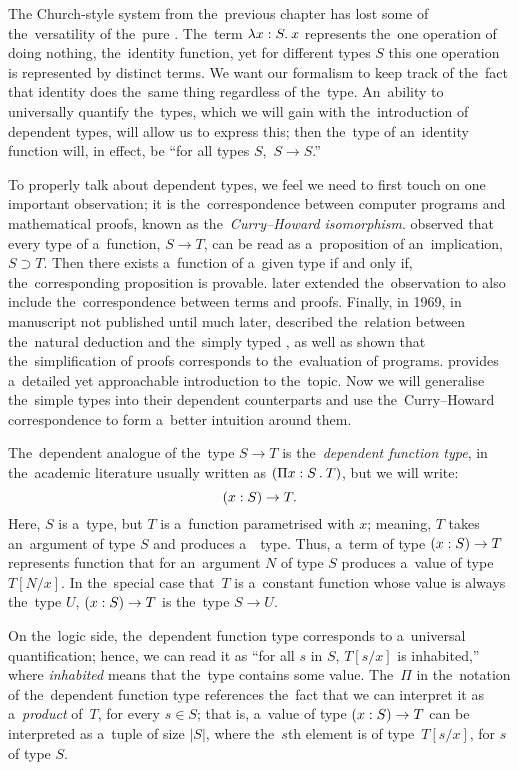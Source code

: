 
The Church-style system from the~previous chapter has lost some of
the~versatility of the~pure \lc. The~term $\lambda x \overset{}: S . \: x$ represents
the~one operation of doing nothing, the~identity function, yet for different
types $S$ this one operation is represented by distinct terms. We want our
formalism to keep track of the~fact that identity does the~same thing regardless
of the~type. An~ability to universally quantify the~types, which we will gain
with the~introduction of dependent types, will allow us to express this; then
the~type of an~identity function will, in effect, be ``for all types $S$,\,
$S \to S$.''

To properly talk about dependent types, we feel we need to first touch on one
important observation; it is the~correspondence between computer programs and
mathematical proofs, known as the~\emph{Curry–Howard isomorphism}.
\citet{curry_1934} observed that every type of a~function, $S \to T$,
can be read as a~proposition of an~implication, $S \supset T$. Then there exists
a~function of a~given type if and only if, the~corresponding proposition is
provable. \citet{curry_1958} later extended the~observation to also include
the~correspondence between terms and proofs. Finally, in 1969, in manuscript not
published until much later, \citet{howard_1980} described the~relation between
the~natural deduction and the~simply typed \lc, as well as shown that
the~simplification of proofs corresponds to the~evaluation of programs.
\citet{wadler_2015} provides a~detailed yet approachable introduction to
the~topic. Now we will generalise the~simple types into their dependent
counterparts and use the~Curry–Howard correspondence to form a~better intuition
around them.

The~dependent analogue of the~type $S \to T$ is the~\emph{dependent
function type}, in the~academic literature usually written as ${(\Pi x \overset{}:
S \, . \: T)}$, but we will write:
\[
  (x : S) \to T.
\]
Here, $S$ is a~type, but $T$ is a~function parametrised with $x$; meaning, $T$
takes an~argument of type $S$ and produces a~~type. Thus, a~term of type
$(x : S) \to T$ represents function that for an~argument $N$ of type $S$ produces
a~value of type \,$T[N/x]$. In the~special case that \,$T$ is a~constant
function whose value is always the~type $U$, $(x : S) \to T$ is the~type $S \to U$.

On the~logic side, the~dependent function type corresponds to a~universal
quantification; hence, we can read it as ``for all $s$ in $S$, $T[s/x]$ is
inhabited,'' where \emph{inhabited} means that the~type contains some value.
The~$\Pi$ in the~notation of the~dependent function type references the~fact
that we can interpret it as a~\emph{product} of \,$T$, for every $s \in S$; that
is, a~value of type $(x : S) \to T$ can be interpreted as a~tuple of size $|S|$,
where the~$s$th element is of type \,$T[s/x]$, for $s$ of type $S$.

